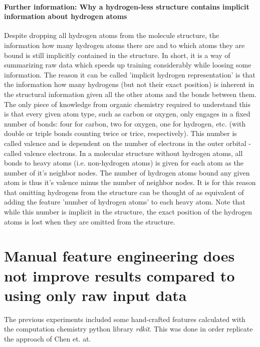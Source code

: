 \paragraph{Further information: Why a hydrogen-less structure contains implicit information about hydrogen atoms}
Despite dropping all hydrogen atoms from the molecule structure, the information how many hydrogen atoms there are and to which atoms they are bound is still implicitly contained in the structure. In short, it is a way of summarizing raw data which speeds up training considerably while loosing some information. The reason it can be called 'implicit hydrogen representation' is that the information how many hydrogens (but not their exact position) is inherent in the structural information given all the other atoms and the bonds between them. The only piece of knowledge from organic chemistry required to understand this is that every given atom type, such as carbon or oxygen, only engages in a fixed number of bonds: four for carbon, two for oxygen, one for hydrogen, etc. (with double or triple bonds counting twice or trice, respectively). This number is called valence and is dependent on the number of electrons in the outer orbital - called valence electrons. In a molecular structure without hydrogen atoms, all bonds to heavy atoms (i.e. non-hydrogen atoms) is given for each atom as the number of it's neighbor nodes. The number of hydrogen atoms bound any given atom is thus it's valence minus the number of neighbor nodes. It is for this reason that omitting hydrogens from the structure can be thought of as equivalent of adding the feature 'number of hydrogen atoms' to each heavy atom. Note that while this number is implicit in the structure, the exact position of the hydrogen atoms is lost when they are omitted from the structure.


\section{Manual feature engineering does not improve results compared to using only raw input data}

The previous experiments included some hand-crafted features calculated with the computation chemistry python library \textit{rdkit}. This was done in order replicate the approach of Chen et. at.~\cite{Chen2019}

